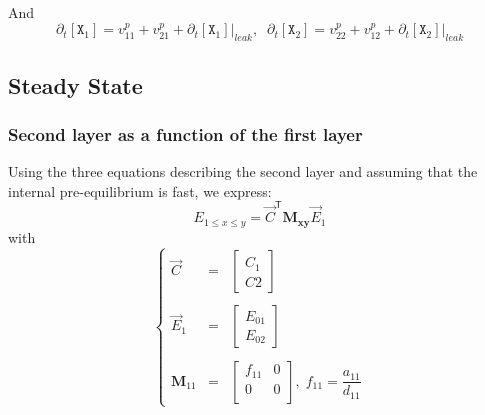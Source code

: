\documentclass[aps,onecolumn,12pt]{revtex4}
\newcommand{\mychem}[1]{\mathtt{#1}}
\newcommand{\myconc}[1]{\left[#1\right]}
\newcommand{\spx}{\mychem{X}}
\newcommand{\mytrn}[1]{{#1}^{\!\mathsf{T}}}
\newcommand{\mymat}[1]{{\bm{#1}}}
\begin{document}
And
\begin{equation}
	\partial_t \myconc{\spx_1} = v^p_{11}+v^p_{21} + \partial_t \myconc{\spx_1}\vert_{leak},\;\;
	\partial_t \myconc{\spx_2} = v^p_{22}+v^p_{12} + \partial_t \myconc{\spx_2}\vert_{leak}
\end{equation}

\subsection{Steady State}

\subsubsection{Second layer as a function of the first layer}
Using the three equations describing the second layer and assuming that the internal pre-equilibrium is fast, we express:
\begin{equation}
E_{1\leq x \leq y } = \mytrn{\vec{C}} \mymat{M_{xy}} \vec{E}_1
\end{equation}
with
\begin{equation}
\left\lbrace
\begin{array}{rcl}
\vec{C}   & = & \begin{bmatrix} C_1 \\ C2 \end{bmatrix}\\
\\
\vec{E}_1 & = & \begin{bmatrix} E_{01} \\ E_{02} \end{bmatrix}\\
\\
\mymat{M}_{11} & = & 
\begin{bmatrix}
	f_{11} & 0 \\
	0 & 0\\
\end{bmatrix}, \; f_{11} = \dfrac{a_{11}}{d_{11}}
\end{array}
\right.
\end{equation}
\end{document}
